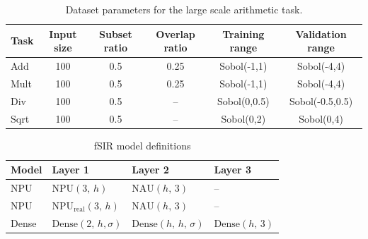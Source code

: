 \documentclass[9pt]{article}
\newcommand{\npu}{\text{NPU}}
\newcommand{\nau}{\text{NAU}}
\newcommand{\dense}{\text{Dense}}
\begin{document}
\begin{table}[h]
  \centering
  \caption{Dataset parameters for the large scale arithmetic task.}
  \label{tab:dataset_params_large_scale}
  \begin{tabular}{lccccc}
    \toprule
    Task & Input size & Subset ratio & Overlap ratio & Training range  & Validation range\\
    \midrule
    Add  & 100        & 0.5          & 0.25          & Sobol(-1,1)     & Sobol(-4,4) \\
    Mult & 100        & 0.5          & 0.25          & Sobol(-1,1)     & Sobol(-4,4)\\
    Div  & 100        & 0.5          & --            & Sobol(0,0.5)    & Sobol(-0.5,0.5) \\
    Sqrt & 100        & 0.5          & --            & Sobol(0,2)      & Sobol(0,4) \\
    \bottomrule
  \end{tabular}
\end{table}

\begin{table}[h]
  \centering
  \caption{fSIR model definitions}
  \label{tab:fsir_models}
  \begin{tabular}{llll}
    \toprule
    Model & Layer 1 & Layer 2 & Layer 3 \\
    \midrule
    NPU & $\npu(3,\,h)$ & $\nau(h,\,3)$ & -- \\
    NPU & NPU$_{\text{real}}(3,\,h)$ & $\nau(h,\,3)$ & -- \\
    Dense & $\dense(2,\,h,\sigma)$ & $\dense(h,\,h,\,\sigma)$ & $\dense(h,\,3)$ \\
    \bottomrule
  \end{tabular}
\end{table}
\end{document}
